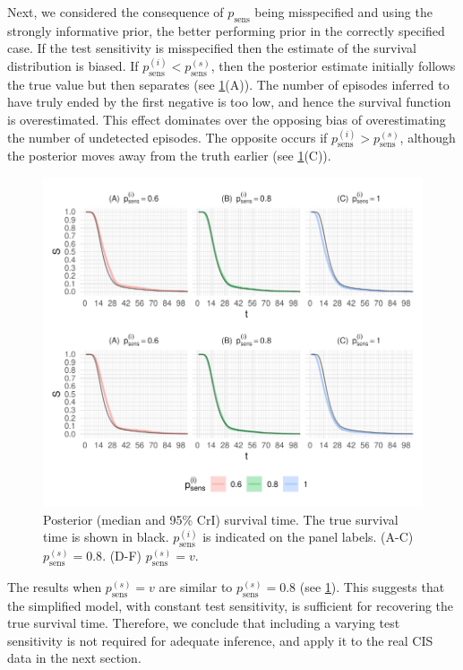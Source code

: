 \documentclass[12pt]{article}
\newcommand{\psens}{p_\text{sens}}
\newcommand{\psenss}{p_\text{sens}^{(s)}}
\newcommand{\psensi}{p_\text{sens}^{(i)}}
\begin{document}
Next, we considered the consequence of $\psens$ being misspecified and using the strongly informative prior, the better performing prior in the correctly specified case.
If the test sensitivity is misspecified then the estimate of the survival distribution is biased.
If $\psensi < \psenss$, then the posterior estimate initially follows the true value but then separates (see \cref{imperf-test:fig:test-sensitivity}(A)).
The number of episodes inferred to have truly ended by the first negative is too low, and hence the survival function is overestimated.
This effect dominates over the opposing bias of overestimating the number of undetected episodes.
The opposite occurs if $\psensi > \psenss$, although the posterior moves away from the truth earlier (see \cref{imperf-test:fig:test-sensitivity}(C)).
\begin{figure}[ht!]
  \includegraphics[width=\textwidth]{figures/output/sim-sensitivity}
  \caption[Simulation study results with varying test sensitivity]{%
    Posterior (median and 95\% CrI) survival time.
    The true survival time is shown in black.
    $\psensi$ is indicated on the panel labels.
    (A-C) $\psenss = 0.8$.
    (D-F) $\psenss = v$.
  }
  \label{imperf-test:fig:test-sensitivity}
\end{figure}

The results when $\psenss = v$ are similar to $\psenss = 0.8$ (see \cref{imperf-test:fig:test-sensitivity}).
This suggests that the simplified model, with constant test sensitivity, is sufficient for recovering the true survival time.
Therefore, we conclude that including a varying test sensitivity is not required for adequate inference, and apply it to the real CIS data in the next section.
\begin{figure}
\end{figure}
\end{document}
